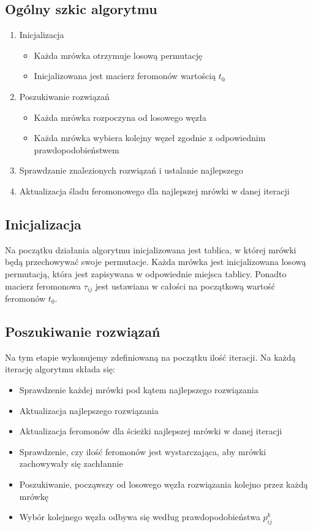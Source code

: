 \documentclass[12pt]{article}
\begin{document}
\subsection{Ogólny szkic algorytmu}
\begin{enumerate}
\item Inicjalizacja
	\begin{itemize}
	\item Każda mrówka otrzymuje losową permutację
	\item Inicjalizowana jest macierz feromonów wartością $t_0$
	\end{itemize}
\item Poszukiwanie rozwiązań
	\begin{itemize}
	\item Każda mrówka rozpoczyna od losowego węzła
	\item Każda mrówka wybiera kolejny węzeł zgodnie z odpowiednim prawdopodobieństwem
	\end{itemize}
\item Sprawdzanie znalezionych rozwiązań i ustalanie najlepszego
\item Aktualizacja śladu feromonowego dla najlepszej mrówki w danej iteracji
\end{enumerate}

\subsection{Inicjalizacja}
Na początku działania algorytmu inicjalizowana jest tablica, w której mrówki będą przechowywać swoje permutacje. Każda mrówka jest inicjalizowana losową permutacją, która jest zapisywana w odpowiednie miejsca tablicy.
Ponadto macierz feromonowa $\tau_{ij}$ jest ustawiana w całości na początkową wartość feromonów $t_0$.

\subsection{Poszukiwanie rozwiązań}
Na tym etapie wykonujemy zdefiniowaną na początku ilość iteracji.
Na każdą iterację algorytmu składa się:
\begin{itemize}
\item Sprawdzenie każdej mrówki pod kątem najlepszego rozwiązania
\item Aktualizacja najlepszego rozwiązania
\item Aktualizacja feromonów dla ścieżki najlepszej mrówki w danej iteracji
\item Sprawdzenie, czy ilość feromonów jest wystarczająca, aby mrówki zachowywały się zachłannie
\item Poszukiwanie, począwszy od losowego węzła rozwiązania kolejno przez każdą mrówkę
\item Wybór kolejnego węzła odbywa się według prawdopodobieństwa $p_{ij}^{k}$

\end{itemize}
\end{document}
